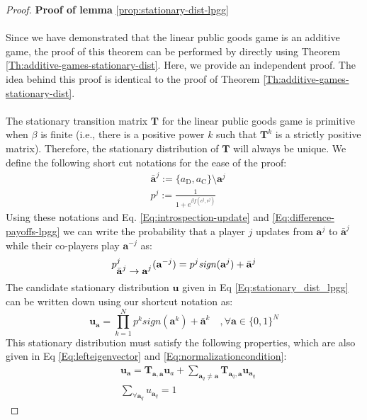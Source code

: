 \documentclass[11pt]{article}
\theoremstyle{plainCl1}
\theoremstyle{plainCl2}
\newcommand{\abf}{\mathbf{a}}
\newcommand{\T}{\mathbf{T}}
\newcommand{\ubf}{\mathbf{u}}
\newcommand{\C}{\mathrm{C}}
\newcommand{\D}{\mathrm{D}}
\begin{document}
\begin{proof}
\textbf{Proof of lemma} \ref{prop:stationary-dist-lpgg} \\ \\
Since we have demonstrated that the linear public goods game is an additive game, the proof of this theorem can be performed by directly using Theorem \ref{Th:additive-games-stationary-dist}. Here, we provide an independent proof. The idea behind this proof is identical to the proof of Theorem \ref{Th:additive-games-stationary-dist}. \\ \\
\noindent The stationary transition matrix $\T$ for the linear public goods game is primitive when $\beta$ is finite (i.e., there is a positive power $k$ such that $\T^k$ is a strictly positive matrix). Therefore, the stationary distribution of $\T$ will always be unique. We define the following short cut notations for the ease of the proof: 
\begin{eqnarray}
&\bar{\abf}^j := \{a_\D,a_\C\} \setminus \abf^j  \\ 
&p^j := \frac{1}{1 + \displaystyle e^{\beta f(c^j, r^j)}}
\end{eqnarray}
Using these notations and Eq. \ref{Eq:introspection-update} and \ref{Eq:difference-payoffs-lpgg} we can write the probability that a player $j$ updates from $\abf^j$ to $\bar{\abf}^j$ while their co-players play $\abf^{-j}$ as:
\begin{equation}
p^j_{\displaystyle \bar{\abf}^j  \to \abf^j} (\abf^{-j}) = p^j \mathit{sign}(\abf^j) + \bar{\abf}^j \\ \\
\end{equation}
The candidate stationary distribution $\ubf$ given in Eq \ref{Eq:stationary_dist_lpgg} can be written down using our shortcut notation as: 
\begin{equation}
\label{Eq:stationary-dist-shortcut}
\ubf_\abf = \prod_{k = 1}^{N}  p^k \mathit{sign}(\abf^k) + \bar{\abf}^k \quad ,\forall \abf \in \{0,1\}^N
\end{equation}
This stationary distribution must satisfy the following properties, which are also given in Eq  \ref{Eq:lefteigenvector} and \ref{Eq:normalizationcondition}:
\begin{align}
\label{Eq:transition-in-proof}
&\ubf_\abf = \T_{\abf,\abf} \ubf_a  + \sum_{\abf_q \neq \abf} \T_{\abf_q, \abf} \ubf_{\abf_q}  \\ 
\label{Eq:normalization-in-proof}
&\sum_{\forall \abf_q} u_{\abf_q}= 1
\end{align}

\end{proof}
\end{document}
